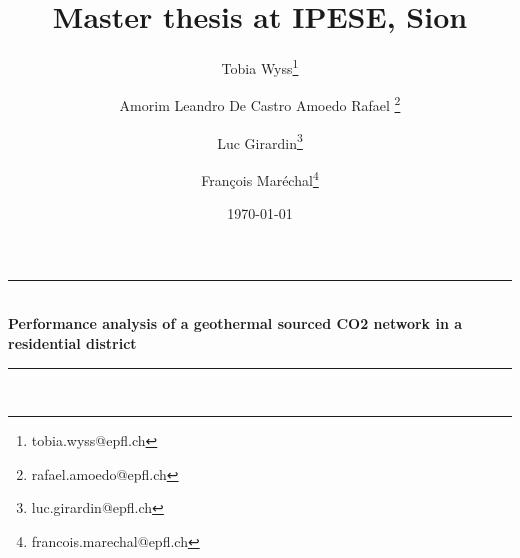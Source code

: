 
\begin{titlepage}

\newcommand{\HRule}{\rule{\linewidth}{0.5mm}} %
\begin{center}{
\HRule \\[0.4cm] 
\huge \bfseries{Performance analysis of a geothermal sourced CO2 network in a residential district}
\HRule \\[0.5cm]}
\end{center}

\title{Master thesis at IPESE, Sion}

\author[2]{Tobia Wyss\thanks{tobia.wyss@epfl.ch}}

\author[1]{Amorim Leandro De Castro Amoedo Rafael \thanks{rafael.amoedo@epfl.ch}}
\author[1]{Luc Girardin\thanks{luc.girardin@epfl.ch}}
\author[1]{Fran\c{c}ois Mar\'echal\thanks{francois.marechal@epfl.ch}}




 

\date{\today} %
{\let\newpage\relax\maketitle}
\vspace*{\fill}

\begin{figure*}[!htb]
\centering
{}\hfill
\quad
{}
\end{figure*}

\thispagestyle{postprintnote}

\end{titlepage}




